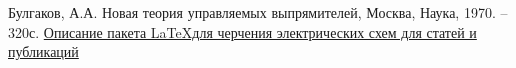 
\renewcommand{\bibname}{}
\begin{thebibliography}{2}
	 Булгаков, А.А. Новая теория управляемых выпрямителей, Москва, Наука, 1970. -- 320с.
         \href{http://texdoc.net/texmf-dist/doc/latex/circuitikz/circuitikzmanual.pdf}{Описание пакета \LaTeX для черчения электрических схем для статей и публикаций}
\end{thebibliography}


